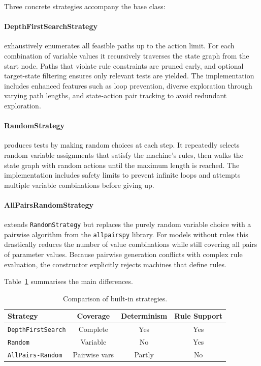 Three concrete strategies accompany the base class:

\paragraph{DepthFirstSearchStrategy} exhaustively enumerates all feasible paths
up to the action limit.  For each combination of variable values it recursively
traverses the state graph from the start node.  Paths that violate rule
constraints are pruned early, and optional target-state filtering ensures only
relevant tests are yielded.  The implementation includes enhanced features such as
loop prevention, diverse exploration through varying path lengths, and
state-action pair tracking to avoid redundant exploration.

\paragraph{RandomStrategy} produces tests by making random choices at each step.
It repeatedly selects random variable assignments that satisfy the machine's
rules, then walks the state graph with random actions until the maximum length is
reached.  The implementation includes safety limits to prevent infinite loops and
attempts multiple variable combinations before giving up.


\paragraph{AllPairsRandomStrategy} extends \texttt{RandomStrategy} but replaces
the purely random variable choice with a pairwise algorithm from the
\texttt{allpairspy} library.  For models without rules this drastically reduces
the number of value combinations while still covering all pairs of parameter
values.  Because pairwise generation conflicts with complex rule evaluation, the
constructor explicitly rejects machines that define rules.

Table~\ref{tab:strategy_compare} summarises the main differences.

\begin{table}[ht]
  \centering
  \begin{tabular}{lccc}
    \toprule
    \textbf{Strategy} & \textbf{Coverage} & \textbf{Determinism} & \textbf{Rule Support} \\
    \midrule
    \texttt{DepthFirstSearch} & Complete & Yes & Yes \\
    \texttt{Random} & Variable & No & Yes \\
    \texttt{AllPairs-Random} & Pairwise vars & Partly & No \\
    \bottomrule
  \end{tabular}
  \caption{Comparison of built-in strategies.}
  \label{tab:strategy_compare}
\end{table}

